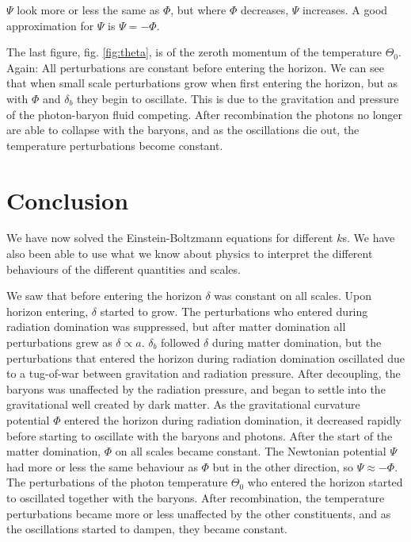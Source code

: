 \documentclass[a4paper,norsk, 10pt]{article}
\begin{document}
$\Psi$ look more or less the same as $\Phi$, but where $\Phi$ decreases, $\Psi$ increases. A good approximation for $\Psi$ is $\Psi = - \Phi$.

The last figure, fig. \ref{fig:theta}, is of the zeroth momentum of the temperature $\Theta_0$. Again: All perturbations are constant before entering the horizon. We can see that when small scale perturbations grow when first entering the horizon, but as with $\Phi$ and $\delta_b$ they begin to oscillate. This is due to the gravitation and pressure of the photon-baryon fluid competing. After recombination the photons no longer are able to collapse with the baryons, and as the oscillations die out, the temperature perturbations become constant.


\newpage


\section{Conclusion}
We have now solved the Einstein-Boltzmann equations for different $k$s. We have also been able to use what we know about physics to interpret the different behaviours of the different quantities and scales. 

We saw that before entering the horizon $\delta$ was constant on all scales. Upon horizon entering, $\delta$ started to grow. The perturbations who entered during radiation domination was suppressed, but after matter domination all perturbations grew as $\delta \propto a$. $\delta_b$ followed $\delta$ during matter domination, but the perturbations that entered the horizon during radiation domination oscillated due to a tug-of-war between gravitation and radiation pressure. After decoupling, the baryons was unaffected by the radiation pressure, and began to settle into the gravitational well created by dark matter.
As the gravitational curvature potential $\Phi$ entered the horizon during radiation domination, it decreased rapidly before starting to oscillate with the baryons and photons. After the start of the matter domination, $\Phi$ on all scales became constant. The Newtonian potential $\Psi$ had more or less the same behaviour as $\Phi$ but in the other direction, so $\Psi \approx -\Phi$.
The perturbations of the photon temperature $\Theta_0$ who entered the horizon started to oscillated together with the baryons. After recombination, the temperature perturbations became more or less unaffected by the other constituents, and as the oscillations started to dampen, they became constant.
\end{document}
